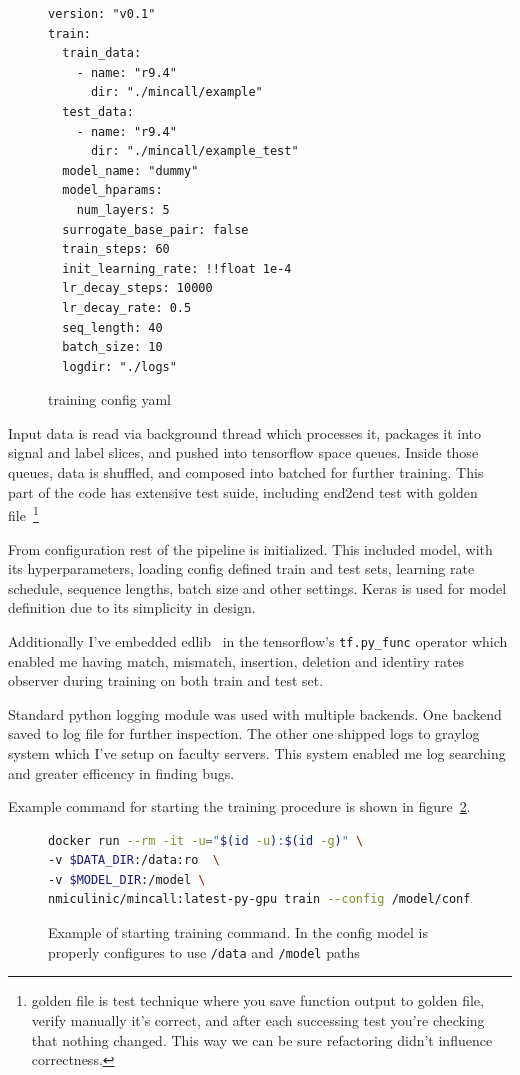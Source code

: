 \documentclass[times, utf8, diplomski, english]{fer}
\begin{document}
\begin{figure}
    \begin{center}
    \begin{lstlisting}[]
version: "v0.1"
train:
  train_data:
    - name: "r9.4"
      dir: "./mincall/example"
  test_data:
    - name: "r9.4"
      dir: "./mincall/example_test"
  model_name: "dummy"
  model_hparams:
    num_layers: 5
  surrogate_base_pair: false
  train_steps: 60
  init_learning_rate: !!float 1e-4
  lr_decay_steps: 10000
  lr_decay_rate: 0.5
  seq_length: 40
  batch_size: 10
  logdir: "./logs"
    \end{lstlisting}
    \caption{training config yaml}
    \label{fg:train_cfg_yml}
    \end{center}
\end{figure}

Input data is read via background thread which processes it, packages it into signal and label slices, and pushed into tensorflow space queues. Inside those queues, data is shuffled, and composed into batched for further training. This part of the code has extensive test suide, including end2end test with golden file~\footnote{golden file is test technique where you save function output to golden file, verify manually it's correct, and after each successing test you're checking that nothing changed. This way we can be sure refactoring didn't influence correctness.}

From configuration rest of the pipeline is initialized. This included model, with its hyperparameters, loading config defined train and test sets, learning rate schedule, sequence lengths, batch size and other settings. Keras is used for model definition due to its simplicity in design. 

Additionally I've embedded edlib~\citep{edlib} in the tensorflow's \texttt{tf.py\_func} operator which enabled me having match, mismatch, insertion, deletion and identiry rates observer during training on both train and test set.

Standard python logging module was used with multiple backends. One backend saved to log file for further inspection. The other one shipped logs to graylog system which I've setup on faculty servers. This system enabled me log searching and greater efficency in finding bugs. 

Example command for starting the training procedure is shown in figure~\ref{fg:train_cfg_sh}.

\begin{figure}
    \begin{center}
    \begin{lstlisting}[language=bash,style=protobuf]
docker run --rm -it -u="$(id -u):$(id -g)" \
-v $DATA_DIR:/data:ro  \
-v $MODEL_DIR:/model \ 
nmiculinic/mincall:latest-py-gpu train --config /model/config.yml
    \end{lstlisting}
    \caption{Example of starting training command. In the config model is properly configures to use \texttt{/data} and \texttt{/model} paths}
    \label{fg:train_cfg_sh}
    \end{center}
\end{figure}
\end{document}
